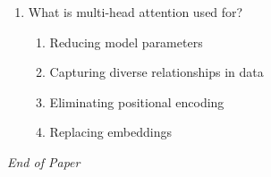 \documentclass[12pt]{article}
\begin{document}
\begin{enumerate}[label=Q\arabic*.]
\begin{enumerate}[label=(\Alph*)]
    \item Relative positional encoding
    \item Rotary positional encoding
    \item Sinusoidal positional encoding
\end{enumerate}
\item What is multi-head attention used for?
\begin{enumerate}[label=(\Alph*)]
    \item Reducing model parameters
    \item Capturing diverse relationships in data
    \item Eliminating positional encoding
    \item Replacing embeddings
\end{enumerate}
\end{enumerate}

\vfill
\noindent\textit{End of Paper}
\end{document}
